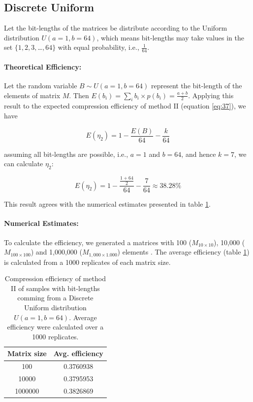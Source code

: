 \documentclass[10pt]{article}
\begin{document}
\subsection*{Discrete Uniform}
Let the bit-lengths of the matrices be distribute according to the Uniform distribution $U(a=1,b=64)$, which means bit-lengths may take values in the set $\{1, 2, 3, $\ldots$, 64\}$ with equal probability, i.e., $\frac{1}{64}$. 

\paragraph{Theoretical Efficiency:}
Let the random variable $B \sim U(a=1,b=64)$ represent the  bit-length of the elements of matrix $M$. Then $E(b_i) = \sum_{i} b_i \times p(b_i) = \frac{a+b}{2}$.  Applying this result to the expected compression efficiency of method II (equation \ref{eq:37}), we have 

\begin{equation}\label{eq:44}
 E(\eta_2) = 1 - \frac{E(B)}{64} - \frac{k}{64} 
\end{equation}

assuming all bit-lengths are possible, i.e., $a=1$ and $b=64$, and hence $k=7$, we can calculate $\eta_2$:

\begin{equation}\label{eq:45}
 E(\eta_2) = 1 - \frac{\frac{1+64}{2}}{64} - \frac{7}{64} \approx 38.28\% 
\end{equation}

This result agrees with the numerical estimates presented in table \ref{tab:03}.

\paragraph{Numerical Estimates:}
To calculate the efficiency, we generated a matrices with 100 ($M_{10 \times 10}$), 10,000 ($M_{100 \times 100}$) and 1,000,000 ($M_{1,000 \times 1.000}$) elements . The average efficiency (table \ref{tab:03}) is calculated from a 1000 replicates of each matrix size.

\begin{table}[h]
  \centering
  \caption{Compression efficiency of method II of samples with bit-lengths comming from a Discrete Uniform distribution $U(a=1,b=64)$. Average efficiency were calculated over a 1000 replicates.}
 \begin{tabular}{cc}
    \hline
    Matrix size & Avg. efficiency \\
    \hline
     100	& 0.3760938 \\
     10000 	& 0.3795953 \\
     1000000 	& 0.3826869 \\
    \hline
 \end{tabular}
 \label{tab:03}
\end{table}
\end{document}
